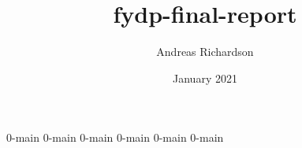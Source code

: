 \documentclass{report}
\title{fydp-final-report}
\author{Andreas Richardson}
\date{January 2021}
\begin{document}
\maketitle



\tableofcontents
\listoffigures
\listoftables

{0-main}
{0-main}
{0-main}
{0-main}
{0-main}
{0-main}
\end{document}
